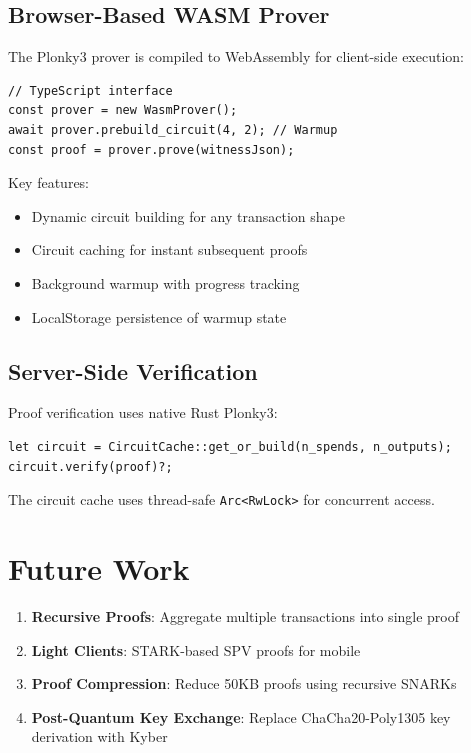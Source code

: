 \documentclass[11pt,a4paper]{article}
\begin{document}
\subsection{Browser-Based WASM Prover}

The Plonky3 prover is compiled to WebAssembly for client-side execution:

\begin{lstlisting}
// TypeScript interface
const prover = new WasmProver();
await prover.prebuild_circuit(4, 2); // Warmup
const proof = prover.prove(witnessJson);
\end{lstlisting}

Key features:
\begin{itemize}
    \item Dynamic circuit building for any transaction shape
    \item Circuit caching for instant subsequent proofs
    \item Background warmup with progress tracking
    \item LocalStorage persistence of warmup state
\end{itemize}

\subsection{Server-Side Verification}

Proof verification uses native Rust Plonky3:

\begin{lstlisting}
let circuit = CircuitCache::get_or_build(n_spends, n_outputs);
circuit.verify(proof)?;
\end{lstlisting}

The circuit cache uses thread-safe \texttt{Arc<RwLock>} for concurrent access.

\section{Future Work}

\begin{enumerate}
    \item \textbf{Recursive Proofs}: Aggregate multiple transactions into single proof
    \item \textbf{Light Clients}: STARK-based SPV proofs for mobile
    \item \textbf{Proof Compression}: Reduce 50KB proofs using recursive SNARKs
    \item \textbf{Post-Quantum Key Exchange}: Replace ChaCha20-Poly1305 key derivation with Kyber
\end{enumerate}
\end{document}
